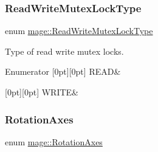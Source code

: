 \subsubsection{\texorpdfstring{Read\+Write\+Mutex\+Lock\+Type}{ReadWriteMutexLockType}}
{\footnotesize\ttfamily enum \hyperlink{namespacemage_afd76fcca37ce5c5b2227671290973c74}{mage\+::\+Read\+Write\+Mutex\+Lock\+Type}}

Type of read write mutex locks. \begin{DoxyEnumFields}{Enumerator}
[0pt][0pt]{}\hypertarget{namespacemage_afd76fcca37ce5c5b2227671290973c74a384918b13691984406aeb754f1c454d0}{}\label{namespacemage_afd76fcca37ce5c5b2227671290973c74a384918b13691984406aeb754f1c454d0} 
R\+E\+AD&\\
\hline

[0pt][0pt]{}\hypertarget{namespacemage_afd76fcca37ce5c5b2227671290973c74aff9d196f4bda4079f3f1ce90bd644662}{}\label{namespacemage_afd76fcca37ce5c5b2227671290973c74aff9d196f4bda4079f3f1ce90bd644662} 
W\+R\+I\+TE&\\
\hline

\end{DoxyEnumFields}
\hypertarget{namespacemage_a548e5c31b08a1078841ed21948f5bf4c}{}\label{namespacemage_a548e5c31b08a1078841ed21948f5bf4c} 
\subsubsection{\texorpdfstring{Rotation\+Axes}{RotationAxes}}
{\footnotesize\ttfamily enum \hyperlink{namespacemage_a548e5c31b08a1078841ed21948f5bf4c}{mage\+::\+Rotation\+Axes}}

